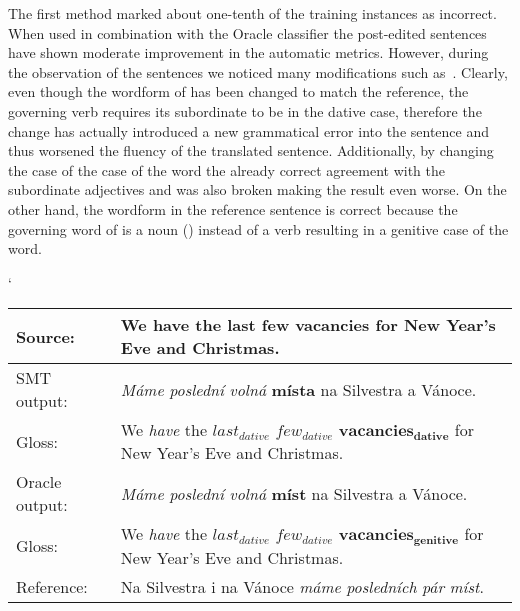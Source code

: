 The first method marked about one-tenth of the training instances as incorrect. When used in combination
with the Oracle classifier the post-edited sentences have shown moderate improvement in the automatic metrics.
However, during the observation of the sentences we noticed many modifications such as~.
Clearly, even though the wordform of  has been changed to match the reference,
the governing verb  requires its subordinate to be in the dative case, therefore the change
has actually introduced a new grammatical error into the sentence and thus worsened
the fluency of the translated sentence. Additionally, by changing the case of the
case of the word  the already correct agreement with the subordinate adjectives
 and  was also broken making the result even worse. On the other hand,
the wordform in the reference sentence is correct because the governing word of 
is a noun () instead of a verb resulting in a genitive case of the word.

\begin{myexample}
    \small
    \catcode`
    \begin{center}
    \begin{tabular}{|l|p{}|}
    \hline
    \textbf{Source:}  &  \textbf{We have the last few vacancies for New Year's Eve and Christmas.}  \\
    \hline
    SMT output:  &  \textit{Máme} \textit{poslední} \textit{volná} \textbf{místa} na Silvestra a Vánoce.  \\
    \hline
    Gloss:  &  We \textit{have} the $\mathit{last_{dative}}$ $\mathit{few_{dative}}$ $\mathbf{vacancies_{dative}}$ for New Year's Eve and Christmas.  \\
    \hline
    Oracle output:  &  \textit{Máme} \textit{poslední} \textit{volná} \textbf{míst} na Silvestra a Vánoce.  \\
    \hline
    Gloss:  &  We \textit{have} the $\mathit{last_{dative}}$ $\mathit{few_{dative}}$ $\mathbf{vacancies_{genitive}}$ for New Year's Eve and Christmas.  \\
    \hline
    Reference:  &  Na Silvestra i na Vánoce \textit{máme} \textit{posledních} \textit{pár} \textit{míst}.  \\
    \hline
    \end{tabular}
    \label{ex-oracle-noref}
    \end{center}
\end{myexample}

